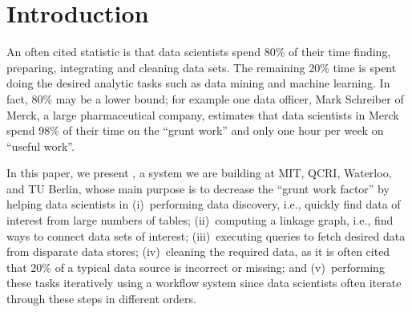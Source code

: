 \section{Introduction}
\label{introduction}

An often cited statistic is that data scientists spend 80\% of their time finding, preparing, integrating and cleaning data sets. The remaining 20\% time is spent doing the desired analytic tasks such as data mining and machine learning. In fact, 80\% may be a lower bound; for example one data officer, Mark Schreiber of Merck, a large pharmaceutical company, estimates that data scientists in Merck spend 98\% of their time on the ``grunt work'' and only one hour per week on ``useful work''.

In this paper, we present \dcv, a system we are building at MIT, QCRI, Waterloo, and TU Berlin, whose main purpose is to decrease the ``grunt work factor'' by helping data scientists in 
(i)~performing data discovery, i.e., quickly find data of interest from large numbers of tables;
(ii)~computing a linkage graph, i.e., find ways to connect data sets of interest;
(iii)~executing queries to fetch desired data from disparate data stores;
(iv)~cleaning the required data, as it is often cited that 20\% of a typical data source is incorrect or missing; and
(v)~performing these tasks iteratively using a workflow system since data scientists often iterate through these steps in different orders.


%
%
%
%
%
%
%
%
%
%

